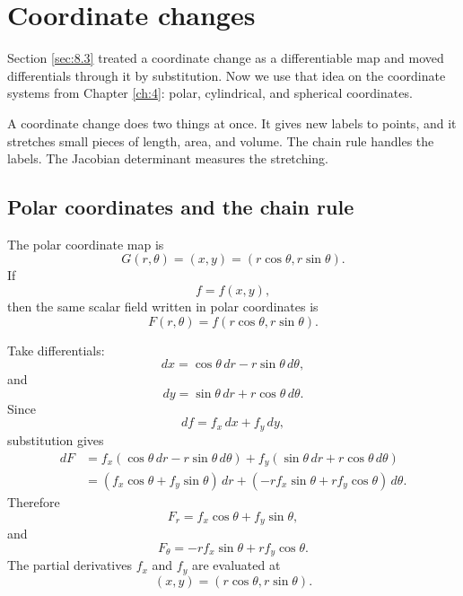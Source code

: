 \section{Coordinate changes}
\label{sec:8.4}

Section \ref{sec:8.3} treated a coordinate change as a differentiable map and moved
differentials through it by substitution.  Now we use that idea on the coordinate systems
from Chapter \ref{ch:4}: polar, cylindrical, and spherical coordinates.

A coordinate change does two things at once.  It gives new labels to points, and it
stretches small pieces of length, area, and volume.  The chain rule handles the labels.
The Jacobian determinant measures the stretching.

\subsection{Polar coordinates and the chain rule}

The polar coordinate map is
\[
    G(r,\theta)=(x,y)=(r\cos\theta,r\sin\theta).
\]
If
\[
    f=f(x,y),
\]
then the same scalar field written in polar coordinates is
\[
    F(r,\theta)=f(r\cos\theta,r\sin\theta).
\]

Take differentials:
\[
    dx=\cos\theta\,dr-r\sin\theta\,d\theta,
\]
and
\[
    dy=\sin\theta\,dr+r\cos\theta\,d\theta.
\]
Since
\[
    df=f_x\,dx+f_y\,dy,
\]
substitution gives
\[
\begin{aligned}
dF
&=
f_x(\cos\theta\,dr-r\sin\theta\,d\theta)
+
f_y(\sin\theta\,dr+r\cos\theta\,d\theta)\\
&=
(f_x\cos\theta+f_y\sin\theta)\,dr
+
(-rf_x\sin\theta+rf_y\cos\theta)\,d\theta.
\end{aligned}
\]
Therefore
\[
\boxed{
    F_r=f_x\cos\theta+f_y\sin\theta,
}
\]
and
\[
\boxed{
    F_\theta=-r f_x\sin\theta+r f_y\cos\theta.
}
\]
The partial derivatives \(f_x\) and \(f_y\) are evaluated at
\[
    (x,y)=(r\cos\theta,r\sin\theta).
\]

